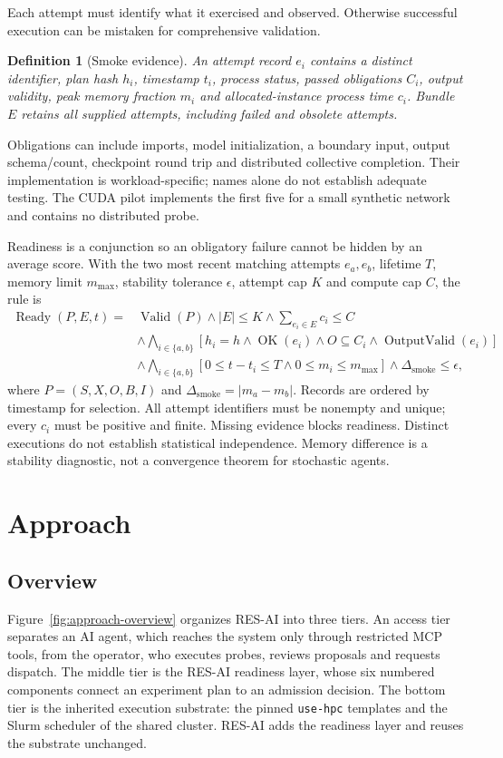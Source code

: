 \documentclass[pdflatex,sn-mathphys-num]{sn-jnl}
\theoremstyle{thmstylethree}
\newtheorem{definition}{Definition}
\newcommand{\tool}{\textsc{RES-AI}}
\newcommand{\upstream}{\texttt{use-hpc}}
\begin{document}
Each attempt must identify what it exercised and observed. Otherwise successful execution can be mistaken for comprehensive validation.
\begin{definition}[Smoke evidence]
An attempt record $e_i$ contains a distinct identifier, plan hash $h_i$, timestamp $t_i$, process status, passed obligations $C_i$, output validity, peak memory fraction $m_i$ and allocated-instance process time $c_i$. Bundle $E$ retains all supplied attempts, including failed and obsolete attempts.
\end{definition}
Obligations can include imports, model initialization, a boundary input, output schema/count, checkpoint round trip and distributed collective completion. Their implementation is workload-specific; names alone do not establish adequate testing. The CUDA pilot implements the first five for a small synthetic network and contains no distributed probe.

Readiness is a conjunction so an obligatory failure cannot be hidden by an average score. With the two most recent matching attempts $e_a,e_b$, lifetime $T$, memory limit $m_{\max}$, stability tolerance $\epsilon$, attempt cap $K$ and compute cap $C$, the rule is
\begin{align}
\operatorname{Ready}(P,E,t)={}&\operatorname{Valid}(P)\land |E|\leq K\land\sum_{e_i\in E}c_i\leq C \label{eq:ready}\\
&\land\bigwedge_{i\in\{a,b\}}[h_i=h\land\operatorname{OK}(e_i)\land O\subseteq C_i\land\operatorname{OutputValid}(e_i)]\nonumber\\
&\land\bigwedge_{i\in\{a,b\}}[0\leq t-t_i\leq T\land0\leq m_i\leq m_{\max}]\land\Delta_{\mathrm{smoke}}\leq\epsilon,\nonumber
\end{align}
where $P=(S,X,O,B,I)$ and $\Delta_{\mathrm{smoke}}=|m_a-m_b|$. Records are ordered by timestamp for selection. All attempt identifiers must be nonempty and unique; every $c_i$ must be positive and finite. Missing evidence blocks readiness. Distinct executions do not establish statistical independence. Memory difference is a stability diagnostic, not a convergence theorem for stochastic agents.


\section{Approach}\label{sec:approach}
\subsection{Overview}\label{sec:approach-overview}
Figure~\ref{fig:approach-overview} organizes \tool{} into three tiers. An access tier separates an AI agent, which reaches the system only through restricted MCP tools, from the operator, who executes probes, reviews proposals and requests dispatch. The middle tier is the \tool{} readiness layer, whose six numbered components connect an experiment plan to an admission decision. The bottom tier is the inherited execution substrate: the pinned \upstream{} templates and the Slurm scheduler of the shared cluster. \tool{} adds the readiness layer and reuses the substrate unchanged.
\end{document}
